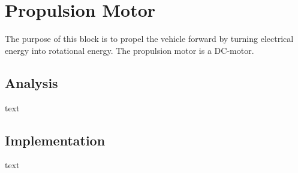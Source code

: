 \section{Propulsion Motor}
The purpose of this block is to propel the vehicle forward by turning electrical energy into rotational energy. The propulsion motor is a DC-motor. 

\subsection{Analysis}
text

\subsection{Implementation}
text

